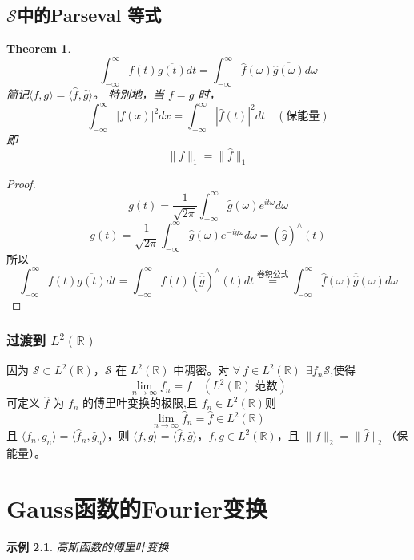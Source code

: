 \documentclass[linespread=1.5,openany]{book}%
\theoremstyle{plain}
\newtheorem{theorem}{Theorem}
\newtheorem{example}[theorem]{示例}
\begin{document}
{			\section{$\mathcal{S}$中的Parseval 等式}{\begin{theorem}
					\[
					\int_{-\infty}^{\infty} f(t)\overline{g(t)}dt = \int_{-\infty}^{\infty} \hat{f}(\omega)\overline{\hat{g}(\omega)}d\omega
					\]
					简记\( \langle f, g \rangle = \langle \hat{f}, \hat{g} \rangle \)。
					特别地，当 \( f = g \) 时，
					\[
					\int_{-\infty}^{\infty} |f(x)|^2 dx = \int_{-\infty}^{\infty} |\hat{f}(t)|^2 dt \quad (\text{保能量})
					\]
					即 \[ \|f\|_1 = \|\hat{f}\|_1 \]
				\end{theorem}
				\begin{proof}
					\[ g(t)=\frac{1}{\sqrt{2\pi}}\int_{-\infty}^{\infty} \hat{g}(\omega)e^{i t \omega}d\omega \]
					\[
					\overline{g(t)}=\frac{1}{\sqrt{2\pi}}\int_{-\infty}^{\infty} \overline{\hat{g}(\omega)}e^{-i y \omega}d\omega = (\overline{\hat{g}})^{\wedge}(t)
					\]
					所以
					\[
					\int_{-\infty}^{\infty} f(t)\overline{g(t)}dt = \int_{-\infty}^{\infty} f(t)(\overline{\hat{g}})^{\wedge}(t)dt \stackrel{\text{卷积公式}}{=} \int_{-\infty}^{\infty}\hat{f}(\omega)\overline{\hat{g}}(\omega)d\omega
					\]
				\end{proof}
				\subsection{过渡到 \(L^2(\mathbb{R})\)}
				因为 \( \mathcal{S} \subset L^{2}(\mathbb{R}) \)，\( \mathcal{S} \) 在 \( L^{2}(\mathbb{R}) \) 中稠密。对 \( \forall\  f \in L^{2}(\mathbb{R})\ \  \exists f_n \mathcal{S}\),使得
				\[
				\lim_{n \to \infty} f_n = f \quad (L^{2}(\mathbb{R}) \text{ 范数})
				\]
				可定义 \( \hat{f} \) 为 \( f_n \) 的傅里叶变换的极限,且 \(f_n\in L^{2}(\mathbb{R})\)则\[ \lim_{n \to \infty} \hat{f}_n = \hat{f} \in L^2(\mathbb{R}) \] 
				且 \( \langle f_n, g_n \rangle = \langle \hat{f}_n, \hat{g}_n \rangle \)，则 \( \langle f, g \rangle = \langle \hat{f}, \hat{g} \rangle \)，\( f, g \in L^{2}(\mathbb{R}) \)，且 \( \|f\|_2 = \|\hat{f}\|_2 \)（保能量）。
			}
			
			\chapter{Gauss函数的Fourier变换}{
				\begin{example}高斯函数的傅里叶变换
					

\end{example}}}
\end{document}
